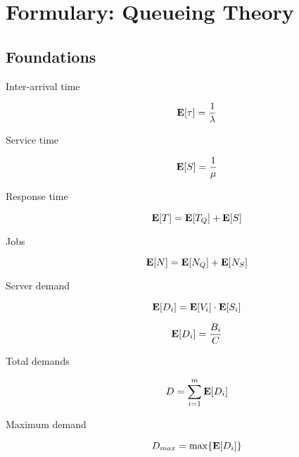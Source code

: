 \section{Formulary: Queueing Theory}
\label{sec:Formulary-Queueing-Theory}

\subsection{Foundations}

\begin{description}
	
	\item [Inter-arrival time]	
		\begin{equation}
		\mathbf{E}[\tau] = \frac{1}{\lambda}
		\end{equation}
	
	\item [Service time]	
		\begin{equation}
		\mathbf{E}[S] = \frac{1}{\mu}
		\end{equation}
	
	\item [Response time]	
		\begin{equation}
		\mathbf{E}[T] = \mathbf{E}[T_{Q}] + \mathbf{E}[S]
		\end{equation}
	
	\item [Jobs]	
		\begin{equation}
		\mathbf{E}[N] = \mathbf{E}[N_{Q}] + \mathbf{E}[N_{S}]
		\end{equation}
	
	\item [Server demand]
		\begin{equation}
		\mathbf{E}[D_{i}] = \mathbf{E}[V_{i}] \cdot \mathbf{E}[S_{i}]
		\end{equation}
	
		\begin{equation}
		\mathbf{E}[D_{i}] = \frac{B_{i}}{C} 
		\end{equation}
	
	\item [Total demands]	
		\begin{equation}
		D = \sum_{i=1}^{m}\mathbf{E}[D_{i}]
		\end{equation}
	
	\item [Maximum demand]	
		\begin{equation}
		D_{max} = \max\{\mathbf{E}[D_{i}]\}
		\end{equation}
		
\end{description}




